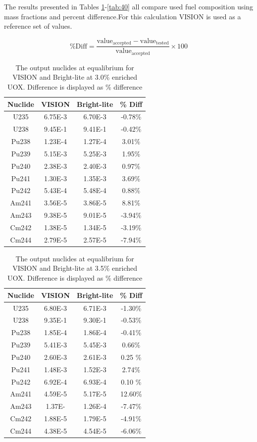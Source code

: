\documentclass{article}
\begin{document}
The results presented in Tables \ref{tab:30}-\ref{tab:40}
all compare used fuel composition using mass fractions and percent difference.For this 
calculation VISION is used as a reference set of values. 
 
\begin{equation}
\label{percentdiff}
\%\mathrm{ Diff} = \mathrm{\frac{value_{accepted} - value_{tested}}{value_{accepted}}\times100}
\end{equation}

\begin{table}[!htb]
\centering
\small
\caption{The output nuclides at equalibrium for VISION and Bright-lite at 3.0\% enriched UOX. Difference is displayed as \% difference}
\label{tab:30}
\vspace{0.5em}
\begin{tabular}{cccc}
Nuclide &  VISION & Bright-lite & \% Diff \\
\hline
U235 & 6.75E-3 & 6.70E-3 & -0.78\%\\
U238 & 9.45E-1 & 9.41E-1 & -0.42\%\\
Pu238 & 1.23E-4 & 1.27E-4 & 3.01\%\\
Pu239 & 5.15E-3 & 5.25E-3 & 1.95\%\\
Pu240 & 2.38E-3 & 2.40E-3 & 0.97\%\\
Pu241 & 1.30E-3 & 1.35E-3 & 3.69\%\\
Pu242 & 5.43E-4 & 5.48E-4 & 0.88\%\\
Am241 & 3.56E-5 & 3.86E-5 & 8.81\%\\
Am243 & 9.38E-5 & 9.01E-5 & -3.94\%\\
Cm242 & 1.38E-5 & 1.34E-5 & -3.19\%\\
Cm244 & 2.79E-5 & 2.57E-5 & -7.94\%\\
\end{tabular}
\end{table}

\begin{table}[!htb]
\centering
\small
\caption{The output nuclides at equalibrium for VISION and Bright-lite at 3.5\% enriched UOX. Difference is displayed as \% difference}
\label{tab:35}
\vspace{0.5em}
\begin{tabular}{cccc}
Nuclide &  VISION & Bright-lite & \% Diff \\
\hline
U235 & 6.80E-3 & 6.71E-3 & -1.30\%\\
U238 & 9.35E-1 & 9.30E-1 & -0.53\%\\
Pu238 & 1.85E-4 & 1.86E-4 & -0.41\%\\
Pu239 & 5.41E-3 & 5.45E-3 & 0.66\%\\
Pu240 & 2.60E-3 & 2.61E-3 & 0.25 \%\\
Pu241 & 1.48E-3 & 1.52E-3 & 2.74\%\\
Pu242 & 6.92E-4 & 6.93E-4 & 0.10 \%\\
Am241 & 4.59E-5 & 5.17E-5 & 12.60\%\\
Am243 & 1.37E- & 1.26E-4 & -7.47\%\\
Cm242 & 1.88E-5 & 1.79E-5 & -4.91\%\\
Cm244 & 4.38E-5 & 4.54E-5 & -6.06\%\\
\end{tabular}
\end{table}
\end{document}
